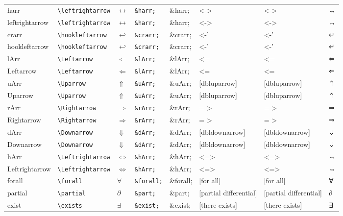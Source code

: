 \documentclass[11pt]{article}
\begin{document}
\begin{longtable}{llllllll}
harr & \texttt{\textbackslash{}leftrightarrow} & $\leftrightarrow$ & \texttt{\&harr;} & \&harr; & <-> & <-> & ↔\\
leftrightarrow & \texttt{\textbackslash{}leftrightarrow} & $\leftrightarrow$ & \texttt{\&harr;} & \&harr; & <-> & <-> & ↔\\
crarr & \texttt{\textbackslash{}hookleftarrow} & $\hookleftarrow$ & \texttt{\&crarr;} & \&crarr; & <-' & <-' & ↵\\
hookleftarrow & \texttt{\textbackslash{}hookleftarrow} & $\hookleftarrow$ & \texttt{\&crarr;} & \&crarr; & <-' & <-' & ↵\\
lArr & \texttt{\textbackslash{}Leftarrow} & $\Leftarrow$ & \texttt{\&lArr;} & \&lArr; & <= & <= & ⇐\\
Leftarrow & \texttt{\textbackslash{}Leftarrow} & $\Leftarrow$ & \texttt{\&lArr;} & \&lArr; & <= & <= & ⇐\\
uArr & \texttt{\textbackslash{}Uparrow} & $\Uparrow$ & \texttt{\&uArr;} & \&uArr; & [dbluparrow] & [dbluparrow] & ⇑\\
Uparrow & \texttt{\textbackslash{}Uparrow} & $\Uparrow$ & \texttt{\&uArr;} & \&uArr; & [dbluparrow] & [dbluparrow] & ⇑\\
rArr & \texttt{\textbackslash{}Rightarrow} & $\Rightarrow$ & \texttt{\&rArr;} & \&rArr; & = > & = > & ⇒\\
Rightarrow & \texttt{\textbackslash{}Rightarrow} & $\Rightarrow$ & \texttt{\&rArr;} & \&rArr; & = > & = > & ⇒\\
dArr & \texttt{\textbackslash{}Downarrow} & $\Downarrow$ & \texttt{\&dArr;} & \&dArr; & [dbldownarrow] & [dbldownarrow] & ⇓\\
Downarrow & \texttt{\textbackslash{}Downarrow} & $\Downarrow$ & \texttt{\&dArr;} & \&dArr; & [dbldownarrow] & [dbldownarrow] & ⇓\\
hArr & \texttt{\textbackslash{}Leftrightarrow} & $\Leftrightarrow$ & \texttt{\&hArr;} & \&hArr; & <=> & <=> & ⇔\\
Leftrightarrow & \texttt{\textbackslash{}Leftrightarrow} & $\Leftrightarrow$ & \texttt{\&hArr;} & \&hArr; & <=> & <=> & ⇔\\
forall & \texttt{\textbackslash{}forall} & $\forall$ & \texttt{\&forall;} & \&forall; & [for all] & [for all] & ∀\\
partial & \texttt{\textbackslash{}partial} & $\partial$ & \texttt{\&part;} & \&part; & [partial differential] & [partial differential] & ∂\\
exist & \texttt{\textbackslash{}exists} & $\exists$ & \texttt{\&exist;} & \&exist; & [there exists] & [there exists] & ∃\\

\end{longtable}
\end{document}
